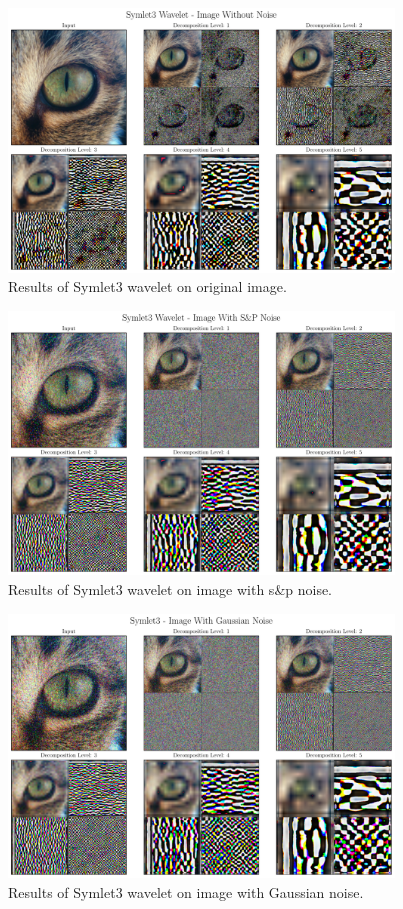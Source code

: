 \documentclass[12pt]{article}
\begin{document}
	\begin{figure}[!h]
		\centering
		\includegraphics[height=7cm]{../Tests/Outputs/2D_Symlet3Wavelet_WithoutNoise.pdf}
		\caption{Results of Symlet3 wavelet on original image.}
		\label{fig:2d_sym3}
	\end{figure}
	\clearpage
	\begin{figure}[!h]
		\centering
		\includegraphics[height=7cm]{../Tests/Outputs/2D_Symlet3Wavelet_SPNoise.pdf}
		\caption{Results of Symlet3 wavelet on image with s\&p noise.}
		\label{fig:2d_sym3_sp}
	\end{figure}
	
	\begin{figure}[!h]
		\centering
		\includegraphics[height=7cm]{../Tests/Outputs/2D_Symlet3Wavelet_GaussianNoise.pdf}
		\caption{Results of Symlet3 wavelet on image with Gaussian noise.}
		\label{fig:2d_sym3_gs}
	\end{figure}
	
\end{document}
